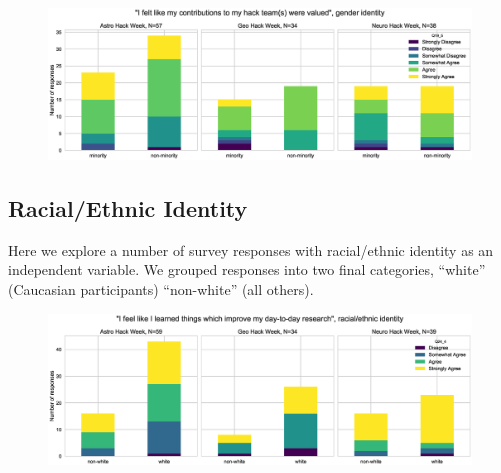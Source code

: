\documentclass{aastex62}
\begin{document}
\begin{figure}[h!]
\centering
\includegraphics[width=\textwidth]{Q19_5_Q27_stackedbars.eps}
\caption{}
\label{fig:corr8}
\end{figure}

\clearpage

\subsection{Racial/Ethnic Identity}

Here we explore a number of survey responses with racial/ethnic identity as an independent variable. We grouped responses into two final categories, ``white'' (Caucasian participants) ``non-white'' (all others).

\begin{figure}[h!]
\centering
\includegraphics[width=\textwidth]{Q24_4_Q30_stackedbars.eps}
\caption{}
\label{fig:corr9}
\end{figure}
\end{document}

